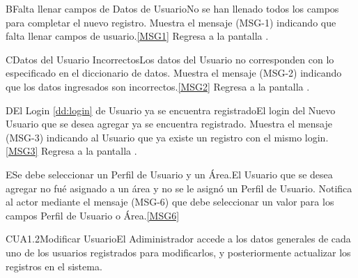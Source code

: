 	\begin{UCtrayectoriaA}{B}{Falta llenar campos de Datos de Usuario}{No se han llenado todos los campos para completar el nuevo registro.}
			\UCpaso Muestra el mensaje (MSG-1) indicando que falta llenar campos de usuario.\ref{MSG1} 
			\UCpaso Regresa a la pantalla .
	\end{UCtrayectoriaA}

	\begin{UCtrayectoriaA}{C}{Datos del Usuario Incorrectos}{Los datos del Usuario no corresponden con lo especificado en el diccionario de datos.}
			\UCpaso Muestra el mensaje (MSG-2) indicando que los datos ingresados son incorrectos.\ref{MSG2}
			\UCpaso Regresa a la pantalla .
	\end{UCtrayectoriaA}

		\begin{UCtrayectoriaA}{D}{El Login \ref{dd:login} de Usuario ya se encuentra registrado}{El login del Nuevo Usuario que se desea agregar ya se encuentra registrado.}
			\UCpaso Muestra el mensaje (MSG-3) indicando al Usuario que ya existe un registro con el mismo login.\ref{MSG3}
			\UCpaso Regresa a la pantalla .
		\end{UCtrayectoriaA}

		\begin{UCtrayectoriaA}{E}{Se debe seleccionar un Perfil de Usuario y un Área.}{El Usuario que se desea agregar no fué asignado a un área y no se le asignó un Perfil de Usuario.}	
			\UCpaso Notifica al actor mediante el mensaje (MSG-6) que debe seleccionar un valor para los campos Perfil de Usuario o Área.\ref{MSG6}
		\end{UCtrayectoriaA}



	\begin{UseCase}{CUA1.2}{Modificar Usuario}{El Adiministrador accede a los datos generales de cada uno de los usuarios registrados para modificarlos, y posteriormente actualizar los registros en el sistema.}
	\end{UseCase}

